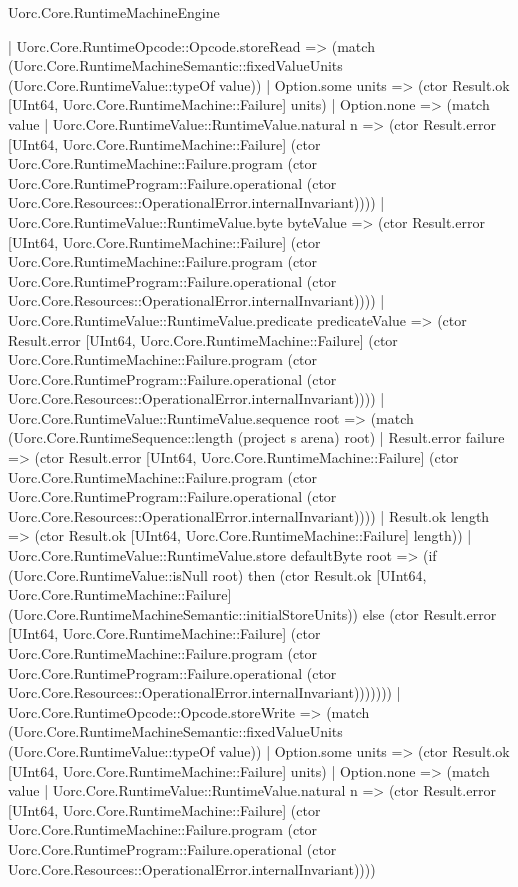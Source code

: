 \begin{lexlean}{Uorc.Core.RuntimeMachineEngine}
\begin{semanticmodule}
{          | Uorc.Core.RuntimeOpcode::Opcode.storeRead => (match (Uorc.Core.RuntimeMachineSemantic::fixedValueUnits (Uorc.Core.RuntimeValue::typeOf value))
            | Option.some units => (ctor Result.ok [UInt64, Uorc.Core.RuntimeMachine::Failure] units)
            | Option.none => (match value
              | Uorc.Core.RuntimeValue::RuntimeValue.natural n => (ctor Result.error [UInt64, Uorc.Core.RuntimeMachine::Failure] (ctor Uorc.Core.RuntimeMachine::Failure.program (ctor Uorc.Core.RuntimeProgram::Failure.operational (ctor Uorc.Core.Resources::OperationalError.internalInvariant))))
              | Uorc.Core.RuntimeValue::RuntimeValue.byte byteValue => (ctor Result.error [UInt64, Uorc.Core.RuntimeMachine::Failure] (ctor Uorc.Core.RuntimeMachine::Failure.program (ctor Uorc.Core.RuntimeProgram::Failure.operational (ctor Uorc.Core.Resources::OperationalError.internalInvariant))))
              | Uorc.Core.RuntimeValue::RuntimeValue.predicate predicateValue => (ctor Result.error [UInt64, Uorc.Core.RuntimeMachine::Failure] (ctor Uorc.Core.RuntimeMachine::Failure.program (ctor Uorc.Core.RuntimeProgram::Failure.operational (ctor Uorc.Core.Resources::OperationalError.internalInvariant))))
              | Uorc.Core.RuntimeValue::RuntimeValue.sequence root => (match (Uorc.Core.RuntimeSequence::length (project s arena) root)
                | Result.error failure => (ctor Result.error [UInt64, Uorc.Core.RuntimeMachine::Failure] (ctor Uorc.Core.RuntimeMachine::Failure.program (ctor Uorc.Core.RuntimeProgram::Failure.operational (ctor Uorc.Core.Resources::OperationalError.internalInvariant))))
                | Result.ok length => (ctor Result.ok [UInt64, Uorc.Core.RuntimeMachine::Failure] length))
              | Uorc.Core.RuntimeValue::RuntimeValue.store defaultByte root => (if (Uorc.Core.RuntimeValue::isNull root) then (ctor Result.ok [UInt64, Uorc.Core.RuntimeMachine::Failure] (Uorc.Core.RuntimeMachineSemantic::initialStoreUnits)) else (ctor Result.error [UInt64, Uorc.Core.RuntimeMachine::Failure] (ctor Uorc.Core.RuntimeMachine::Failure.program (ctor Uorc.Core.RuntimeProgram::Failure.operational (ctor Uorc.Core.Resources::OperationalError.internalInvariant)))))))
          | Uorc.Core.RuntimeOpcode::Opcode.storeWrite => (match (Uorc.Core.RuntimeMachineSemantic::fixedValueUnits (Uorc.Core.RuntimeValue::typeOf value))
            | Option.some units => (ctor Result.ok [UInt64, Uorc.Core.RuntimeMachine::Failure] units)
            | Option.none => (match value
              | Uorc.Core.RuntimeValue::RuntimeValue.natural n => (ctor Result.error [UInt64, Uorc.Core.RuntimeMachine::Failure] (ctor Uorc.Core.RuntimeMachine::Failure.program (ctor Uorc.Core.RuntimeProgram::Failure.operational (ctor Uorc.Core.Resources::OperationalError.internalInvariant))))
}
\end{semanticmodule}
\end{lexlean}
